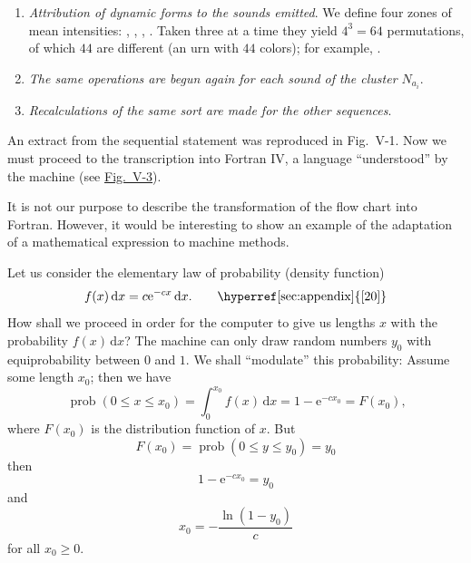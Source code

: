 \documentclass[letterpaper, 11pt]{article}
\begin{document}
\begin{enumerate}
        Finally, the duration \( x \) of the sound will be given by the relation
        \[ x = \pm us\sqrt{2} + m. \]

        We do not take into account incompatibilities between instruments, for this would needlessly
        burden the machine's program and calculation.
    \item
        \textit{Attribution of dynamic forms to the sounds emitted}. We define four zones of mean
        intensities: , , , .
        Taken three at a time they yield \( 4^3 = 64 \) permutations, of which \( 44 \) are
        different (an urn with \( 44 \) colors); for example,
         \crescHairpin {} \decrescHairpin {}.

        \begin{table}[htb]
            \centering
            \caption{
                Table of the 44 Intensity Forms Derived \\
                from 4 Mean Intensity Values , , ,
            }
        \end{table}

    \item
        \textit{The same operations are begun again for each sound of the cluster \( N_{a_i} \)}.
    \item
        \textit{Recalculations of the same sort are made for the other sequences}.
\end{enumerate}

An extract from the sequential statement was reproduced in Fig.\ V-1. Now we must proceed to the
transcription into Fortran IV, a language ``understood'' by the machine (see
\hyperref[fig:fortran]{Fig.\ V-3}). 

It is not our purpose to describe the transformation of the flow chart into Fortran. However, it
would be interesting to show an example of the adaptation of a mathematical expression to machine
methods.

Let us consider the elementary law of probability (density function)
\[
    f(x) \, \mathrm{d}x = c\mathrm{e}^{-cx} \, \mathrm{d}x .
    \tag*{\hyperref[sec:appendix]{[20]}}
\]
How shall we proceed in order for the computer to give us lengths \( x \) with the probability
\( f(x) \, \mathrm{d}x \)? The machine can only draw random numbers \( y_0 \) with equiprobability
between \( 0 \) and \( 1 \). We shall ``modulate'' this probability: Assume some length \( x_0 \);
then we have
\[ \operatorname{prob}{(0 \leq x \leq x_0)} = \int_0^{x_0} f(x) \, \mathrm{d}x = 1 - \mathrm{e}^{-cx_0} = F(x_0) \text{,} \]
where \( F(x_0) \) is the distribution function of \( x \). But
\[ F(x_0) = \operatorname{prob}{(0 \leq y \leq y_0)} = y_0 \]
then
\[ 1 - \mathrm{e}^{-cx_0} = y_0 \]
and
\[ x_0 = - \frac{\ln{(1 - y_0)}}{c} \]
for all \( x_0 \geq 0 \).
\end{document}
